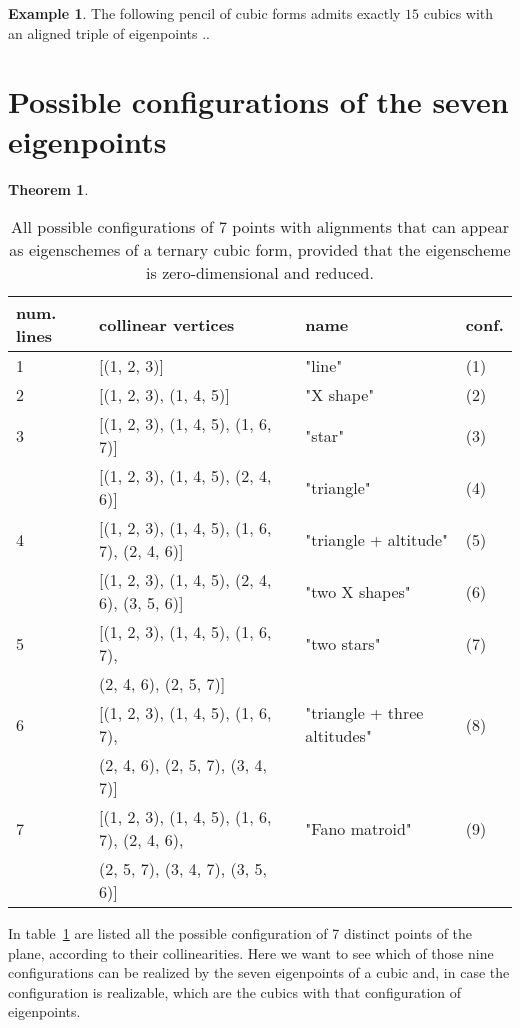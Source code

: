 \documentclass[11pt, a4paper, reqno, captions=tableheading,bibliography=totoc]{scrartcl}
\theoremstyle{plain}
\newtheorem{theorem}[lemma]{Theorem}
\theoremstyle{definition}
\newtheorem{es}[lemma]{Example}
\begin{document}
\begin{es}
The following pencil of cubic forms admits exactly $15$ cubics with an aligned triple of eigenpoints ..
\end{es}

\section{Possible configurations of the seven eigenpoints}
\label{further_alignments}

\begin{theorem}
\label{theorem:possible_alignments}

\end{theorem}

\begin{table}
\label{table:all_alignments}
\caption{All possible configurations of $7$ points with alignments that can appear as eigenschemes of a ternary cubic form, provided that the eigenscheme is zero-dimensional and reduced.}
\centering
\begin{tabular}{|llll|}\hline
  num. lines  & collinear vertices & name & conf.\\ \hline
 1& [(1, 2, 3)] & "line" & (1)\\
 2& [(1, 2, 3), (1, 4, 5)] & "X shape"& (2)\\
 3& [(1, 2, 3), (1, 4, 5), (1, 6, 7)] & "star" & (3)\\
  & [(1, 2, 3), (1, 4, 5), (2, 4, 6)] & "triangle" & (4)\\
 4& [(1, 2, 3), (1, 4, 5), (1, 6, 7), (2, 4, 6)] & "triangle + altitude" & (5)\\
  & [(1, 2, 3), (1, 4, 5), (2, 4, 6), (3, 5, 6)] & "two X shapes" & (6)\\
 5& [(1, 2, 3), (1, 4, 5), (1, 6, 7),  & "two stars" & (7)\\
  & \phantom{[}(2, 4, 6), (2, 5, 7)] & &\\
 6& [(1, 2, 3), (1, 4, 5), (1, 6, 7), & "triangle + three altitudes" & (8)\\
  & \phantom{[} (2, 4, 6), (2, 5, 7), (3, 4, 7)] & & \\
 7& [(1, 2, 3),
   (1, 4, 5),
   (1, 6, 7),
   (2, 4, 6), & "Fano matroid" & (9)\\
  & \phantom{[} (2, 5, 7),
   (3, 4, 7),
   (3, 5, 6)] & & \\ \hline
\end{tabular}
\end{table}

In table~\ref{table:all_alignments} are listed all the possible configuration
of 7 distinct points of the plane, according to their collinearities. Here
we want to see which of those nine configurations can be realized by
the seven eigenpoints of a cubic and, in case the configuration is
realizable, which are the cubics with that configuration of eigenpoints.
\end{document}
